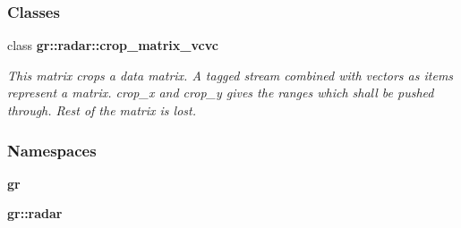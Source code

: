 \subsubsection*{Classes}
\begin{DoxyCompactItemize}
\item 
class {\bf gr\+::radar\+::crop\+\_\+matrix\+\_\+vcvc}
\begin{DoxyCompactList}\small\item\em This matrix crops a data matrix. A tagged stream combined with vectors as items represent a matrix. crop\+\_\+x and crop\+\_\+y gives the ranges which shall be pushed through. Rest of the matrix is lost. \end{DoxyCompactList}\end{DoxyCompactItemize}
\subsubsection*{Namespaces}
\begin{DoxyCompactItemize}
\item 
 {\bf gr}
\item 
 {\bf gr\+::radar}
\end{DoxyCompactItemize}
